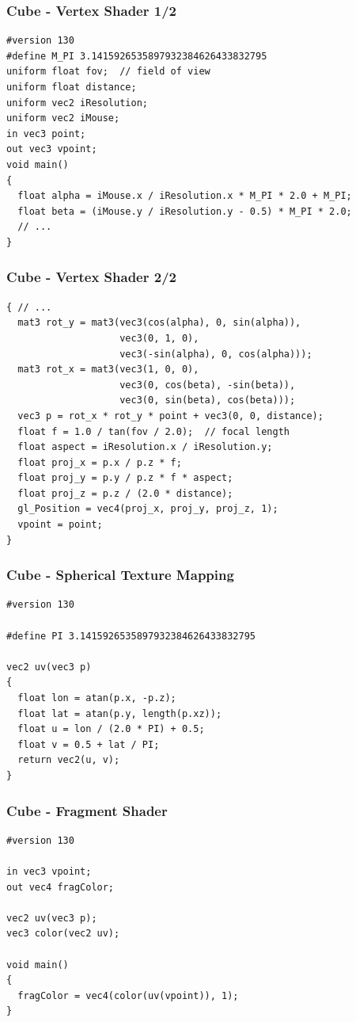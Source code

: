\documentclass[aspectratio=169,11pt,xcolor=dvipsnames]{beamer}
\begin{document}
\begin{frame}[fragile]
  \frametitle{Cube {-} Vertex Shader 1/2}
  \begin{verbatim}
#version 130
#define M_PI 3.1415926535897932384626433832795
uniform float fov;  // field of view
uniform float distance;
uniform vec2 iResolution;
uniform vec2 iMouse;
in vec3 point;
out vec3 vpoint;
void main()
{
  float alpha = iMouse.x / iResolution.x * M_PI * 2.0 + M_PI;
  float beta = (iMouse.y / iResolution.y - 0.5) * M_PI * 2.0;
  // ...
}
  \end{verbatim}
\end{frame}

\begin{frame}[fragile]
  \frametitle{Cube {-} Vertex Shader 2/2}
  \begin{verbatim}
{ // ...
  mat3 rot_y = mat3(vec3(cos(alpha), 0, sin(alpha)),
                    vec3(0, 1, 0),
                    vec3(-sin(alpha), 0, cos(alpha)));
  mat3 rot_x = mat3(vec3(1, 0, 0),
                    vec3(0, cos(beta), -sin(beta)),
                    vec3(0, sin(beta), cos(beta)));
  vec3 p = rot_x * rot_y * point + vec3(0, 0, distance);
  float f = 1.0 / tan(fov / 2.0);  // focal length
  float aspect = iResolution.x / iResolution.y;
  float proj_x = p.x / p.z * f;
  float proj_y = p.y / p.z * f * aspect;
  float proj_z = p.z / (2.0 * distance);
  gl_Position = vec4(proj_x, proj_y, proj_z, 1);
  vpoint = point;
}
  \end{verbatim}
\end{frame}

\begin{frame}[fragile]
  \frametitle{Cube {-} Spherical Texture Mapping}
  \begin{verbatim}
#version 130

#define PI 3.1415926535897932384626433832795

vec2 uv(vec3 p)
{
  float lon = atan(p.x, -p.z);
  float lat = atan(p.y, length(p.xz));
  float u = lon / (2.0 * PI) + 0.5;
  float v = 0.5 + lat / PI;
  return vec2(u, v);
}
  \end{verbatim}
\end{frame}

\begin{frame}[fragile]
  \frametitle{Cube {-} Fragment Shader}
  \begin{verbatim}
#version 130

in vec3 vpoint;
out vec4 fragColor;

vec2 uv(vec3 p);
vec3 color(vec2 uv);

void main()
{
  fragColor = vec4(color(uv(vpoint)), 1);
}
  \end{verbatim}
\end{frame}
\end{document}
